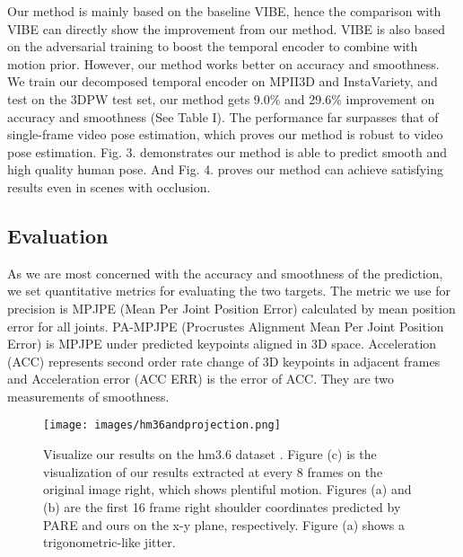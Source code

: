 \documentclass{svproc}
\begin{document}
Our method is mainly based on the baseline VIBE, hence the comparison with VIBE can directly show the improvement from our method. VIBE is also based on the adversarial training to boost the temporal encoder to combine with motion prior. However, our method works better on accuracy and smoothness. We train our decomposed temporal encoder on MPII3D and InstaVariety, and test on the 3DPW test set, our method gets 9.0\% and 29.6\% improvement on accuracy and smoothness (See Table I). The performance far surpasses that of single-frame video pose estimation, which proves our method is robust to video pose estimation. Fig. 3. demonstrates our method is able to predict smooth and high quality human pose. And Fig. 4. proves our method can achieve satisfying results even in scenes with occlusion.




\subsection{Evaluation}

As we are most concerned with the accuracy and smoothness of the prediction, we set quantitative metrics for evaluating the two targets. The metric we use for precision is MPJPE (Mean Per Joint Position Error) calculated by mean position error for all joints. PA-MPJPE (Procrustes Alignment Mean Per Joint Position Error) is MPJPE under predicted keypoints aligned in 3D space. Acceleration (ACC) represents second order rate change of 3D keypoints in adjacent frames and Acceleration error (ACC ERR) is the error of ACC. They are two measurements of smoothness. 

\begin{figure}
    \centering
    \centerline{\texttt{[image: images/hm36andprojection.png]}}
    \caption{Visualize our results on the hm3.6 dataset \cite{ionescu2013human3}. Figure (c) is the visualization of our results extracted at every 8 frames on the original image right, which shows plentiful motion. Figures (a) and (b) are the first 16 frame right shoulder coordinates predicted by PARE and ours on the x-y plane, respectively. Figure (a) shows a trigonometric-like jitter.}
\end{figure}
\end{document}

